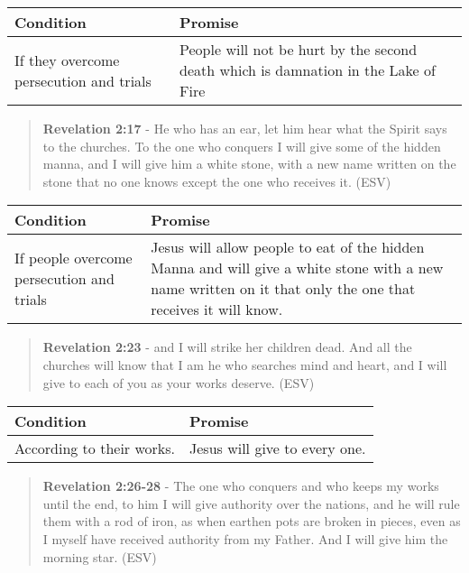 \documentclass[11pt]{article}
\begin{document}
\begin{center}
\begin{tabular}{ll}
Condition & Promise\\[0pt]
\hline
If they overcome persecution and trials & People will not be hurt by the second death which is damnation in the Lake of Fire\\[0pt]
\end{tabular}
\end{center}

\begin{quote}
\textbf{Revelation 2:17} - He who has an ear, let him hear what the Spirit says to the churches. To the one who conquers I will give some of the hidden manna, and I will give him a white stone, with a new name written on the stone that no one knows except the one who receives it. (ESV)
\end{quote}

\begin{center}
\begin{tabular}{ll}
Condition & Promise\\[0pt]
\hline
If people overcome persecution and trials & Jesus will allow people to eat of the hidden Manna and will give a white stone with a new name written on it that only the one that receives it will know.\\[0pt]
\end{tabular}
\end{center}

\begin{quote}
\textbf{Revelation 2:23} - and I will strike her children dead. And all the churches will know that I am he who searches mind and heart, and I will give to each of you as your works deserve. (ESV)
\end{quote}

\begin{center}
\begin{tabular}{ll}
Condition & Promise\\[0pt]
\hline
According to their works. & Jesus will give to every one.\\[0pt]
\end{tabular}
\end{center}

\begin{quote}
\textbf{Revelation 2:26-28} - The one who conquers and who keeps my works until the end, to him I will give authority over the nations, and he will rule them with a rod of iron, as when earthen pots are broken in pieces, even as I myself have received authority from my Father. And I will give him the morning star. (ESV)
\end{quote}
\end{document}
